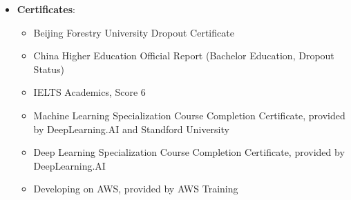 \documentclass[11pt, a4paper]{latex/awesome-cv}
\begin{document}
\begin{itemize}
\begin{itemize}
            \item \href{https://www.leancloud.cn}{Delicious Bookmarks (LeanCloud)} — Software Engineer \\
            \textbf{Jul 2014 — Nov 2015} \\
            * Contributed to LeanCloud Objective-C / Java SDKs and demo apps (LeanChat iOS/Android). Gained early cloud product experience.
        \end{itemize}
    \item \textbf{Certificates}:
        \begin{itemize}
            \item Beijing Forestry University Dropout Certificate
            \item China Higher Education Official Report (Bachelor Education, Dropout Status)
            \item IELTS Academics, Score 6
            \item Machine Learning Specialization Course Completion Certificate, provided by DeepLearning.AI and Standford University
            \item Deep Learning Specialization Course Completion Certificate, provided by DeepLearning.AI
            \item Developing on AWS, provided by AWS Training
        \end{itemize}


\end{itemize}
\end{document}
